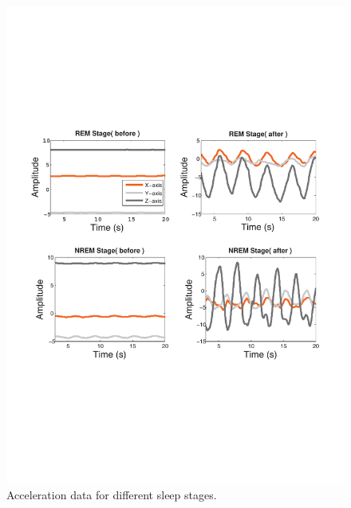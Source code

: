  \begin{figure}[!t]
\centering
      \includegraphics[width=0.75\linewidth]{Figures/cordi.pdf}
  \caption{Acceleration data for different sleep stages.}\label{fig:cordi}
\end{figure}

